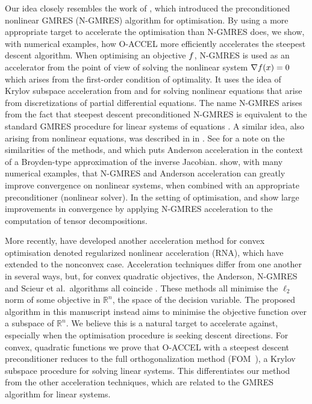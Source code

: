 \documentclass[main.tex]{subfiles}
\begin{document}
Our idea closely resembles the work of \citet{sterck2013steepest},
which introduced the preconditioned nonlinear GMRES (N-GMRES)
algorithm for optimisation. By using a more appropriate target to
accelerate the optimisation than N-GMRES does, we show, with numerical
examples, how O-ACCEL more efficiently accelerates the steepest
descent algorithm.  When optimising an objective $f$, N-GMRES is
used as an accelerator from the point of view of solving the nonlinear
system $\nabla f(x)=0$ which arises from the first-order condition
of optimality.  It uses the idea of Krylov subspace acceleration from
\citet{washio1997krylov} and \citet{oosterlee2000krylov} for solving
nonlinear equations that arise from discretizations of partial
differential equations.  The name N-GMRES arises from the fact that
steepest descent preconditioned N-GMRES is equivalent to the standard
GMRES procedure for linear systems of equations
\citep{washio1997krylov,sterck2013steepest}.  A similar idea, also
arising from nonlinear equations, was described in
\citet{anderson1965iterative} in \citeyear{anderson1965iterative}. See
\citet{walker2011anderson} for a note on the similarities of the
methods, and \citet{fang2009two} which puts Anderson acceleration in
the context of a Broyden-type approximation of the inverse Jacobian.
\citet{brune2015composing} show, with many numerical examples, that
N-GMRES and Anderson acceleration can greatly improve convergence on
nonlinear systems, when combined with an appropriate preconditioner
(nonlinear solver).  In the setting of optimisation,
\citet{sterck2012nonlinear} and \citet{sterck2016nonlinearly} show
large improvements in convergence by applying N-GMRES acceleration to
the computation of tensor decompositions.

More recently, \citet{damien2016regularized} have developed another
acceleration method for convex optimisation denoted regularized
nonlinear acceleration (RNA), which \citet{cartis2017accelerating}
have extended to the nonconvex case.  Acceleration techniques differ
from one another in several ways, but, for convex quadratic
objectives, the Anderson, N-GMRES and Scieur et al.\ algorithms all
coincide \citep{cartis2017accelerating}.  These methods all minimise
the $\ell_2$ norm of some objective in $\mathbb{R}^n$, the space of
the decision variable.  The proposed algorithm in this manuscript
instead aims to minimise the objective function over a subspace of
$\mathbb{R}^n$.  We believe this is a natural target to accelerate
against, especially when the optimisation procedure is seeking descent
directions.  For convex, quadratic functions we prove that O-ACCEL
with a steepest descent preconditioner reduces to the full
orthogonalization method (FOM~\cite{saad2003iterative}), a Krylov
subspace procedure for solving linear systems. This differentiates our
method from the other acceleration techniques, which are related to
the GMRES algorithm for linear systems.
\end{document}
